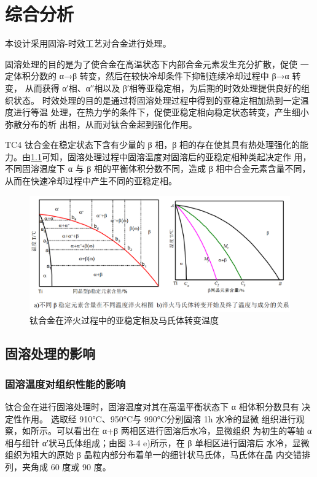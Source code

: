 \chapter{综合分析}
本设计采用固溶-时效工艺对合金进行处理。

固溶处理的目的是为了使合金在高温状态下内部合金元素发生充分扩散，促使 一定体积分数的 α→β 转变，然后在较快冷却条件下抑制连续冷却过程中 β→α 转变， 从而获得 α′相、α′′相以及 β′相等亚稳定相，为后期的时效处理提供良好的组织状态。 时效处理的目的是通过将固溶处理过程中得到的亚稳定相加热到一定温度进行等温 处理，在热力学的条件下，促使亚稳定相向稳定状态转变，产生细小弥散分布的析 出相，从而对钛合金起到强化作用。

TC4 钛合金在稳定状态下含有少量的 β 相，β 相的存在使其具有热处理强化的能 力。由\ref{fig:tc4change}可知，固溶处理过程中固溶温度对固溶后的亚稳定相种类起决定作 用，不同固溶温度下 α 与 β 相的平衡体积分数不同，造成 β 相中合金元素含量不同， 从而在快速冷却过程中产生不同的亚稳定相。
\begin{figure}[h!]
	\centering
	\includegraphics[width=0.7\linewidth]{pic/tc4change}
	\caption{钛合金在淬火过程中的亚稳定相及马氏体转变温度}
	\label{fig:tc4change}
\end{figure}
\section{固溶处理的影响}
\subsection{固溶温度对组织性能的影响}
钛合金在进行固溶处理时，固溶温度对其在高温平衡状态下 α 相体积分数具有 决定性作用。
选取经 910°C、950°C与 990°C分别固溶 1h 水冷的显微 组织进行观察，如所示。可以看出在 α+β 两相区进行固溶后水冷，显微组织 为初生的等轴 α 相与细针 α′状马氏体组成；由图 3-4 e)所示，在 β 单相区进行固溶后 水冷，显微组织为粗大的原始 β 晶粒内部分布着单一的细针状马氏体，马氏体在晶 内交错排列，夹角成 60 度或 90 度。

